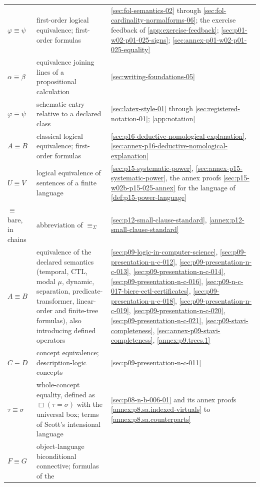 \begin{longtable}{@{}p{}p{}p{}@{}}
\(\varphi\equiv\psi\) & first-order logical equivalence; first-order formulas &
\cref{sec:fol-semantics-02} through \cref{sec:fol-cardinality-normalforms-06};
the exercise feedback of \cref{app:exercise-feedback};
\cref{sec:p01-w02-p01-025-signs}; \cref{sec:annex-p01-w02-p01-025-equality} \\
\(\alpha\equiv\beta\) & equivalence joining lines of a propositional
calculation & \cref{sec:writing-foundations-05} \\
\(\varphi\equiv\psi\) & schematic entry relative to a declared class &
\cref{sec:latex-style-01} through \cref{sec:registered-notation-01};
\cref{app:notation} \\
\(A\equiv B\) & classical logical equivalence; first-order formulas &
\cref{sec:p16-deductive-nomological-explanation},
\cref{sec:annex-p16-deductive-nomological-explanation} \\
\(U\equiv V\) & logical equivalence of sentences of a finite language &
\cref{sec:p15-systematic-power}, \cref{sec:annex-p15-systematic-power},
the annex proofs \cref{sec:p15-w02b-p15-025-annex} for the language of
\cref{def:p15-power-language} \\
\(\equiv\) bare, in chains & abbreviation of \(\equiv_\Sigma\) &
\cref{sec:p12-small-clause-standard}, \cref{annex:p12-small-clause-standard} \\
\(A\equiv B\) & equivalence of the declared semantics (temporal, CTL, modal
\(\mu\), dynamic, separation, predicate-transformer, linear-order and
finite-tree formulas), also introducing defined operators &
\cref{sec:p09-logic-in-computer-science},
\cref{sec:p09-presentation-n-c-012}, \cref{sec:p09-presentation-n-c-013},
\cref{sec:p09-presentation-n-c-014}, \cref{sec:p09-presentation-n-c-016},
\cref{sec:p09-n-c-017-biere-ectl-certificates},
\cref{sec:p09-presentation-n-c-018}, \cref{sec:p09-presentation-n-c-019},
\cref{sec:p09-presentation-n-c-020}, \cref{sec:p09-presentation-n-c-021},
\cref{sec:p09-stavi-completeness}, \cref{sec:annex-p09-stavi-completeness},
\cref{annex:p9.trees.1} \\
\(C\equiv D\) & concept equivalence; description-logic concepts &
\cref{sec:p09-presentation-n-c-011} \\
\(\tau\equiv\sigma\) & whole-concept equality, defined as
\(\Box(\tau=\sigma)\) with the universal box; terms of Scott's intensional
language & \cref{sec:p08-n-b-006-01} and its annex proofs
\cref{annex:p8.sa.indexed-virtuals} to \cref{annex:p8.sa.counterparts} \\
\(F\equiv G\) & object-language biconditional connective; formulas of the

\end{longtable}
